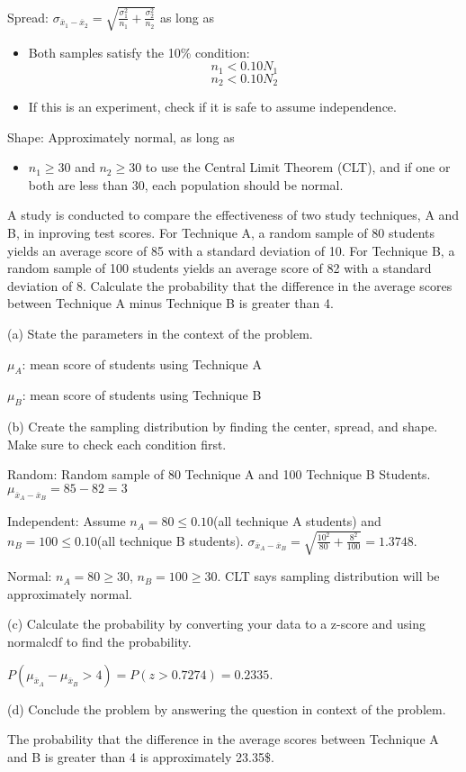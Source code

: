 \documentclass[../stats.tex]{subfiles}
\begin{document}
Spread: $\sigma_{\overline{x}_1-\overline{x}_2}=\sqrt{\frac{\sigma_1^2}{n_1}+\frac{\sigma_2^2}{n_2}}$ as long as 
\begin{itemize}
    \item Both samples satisfy the 10\% condition: 
    \[ n_1<0.10N_1 \] 
    \[ n_2 <0.10 N_2 \]
    \item If this is an experiment, check if it is safe to assume independence.
\end{itemize}

Shape: Approximately normal, as long as 
\begin{itemize}
    \item $n_1\geq 30$ and $n_2\geq 30$ to use the Central Limit Theorem (CLT), and if one or both are less than 30, each population should be normal.
\end{itemize}

\pagebreak
\begin{example}
    A study is conducted to compare the effectiveness of two study techniques, A and B, in inproving test scores. For Technique A, a random sample of 80 students yields an average score of 85 with a standard deviation of 10.
    For Technique B, a random sample of 100 students yields an average score of 82 with a standard deviation of 8. Calculate the probability that the difference in the average scores between Technique A minus Technique B is greater than 4.

    (a) State the parameters in the context of the problem.

    $\mu_A$: mean score of students using Technique A 

    $\mu_B$: mean score of students using Technique B 

    (b) Create the sampling distribution by finding the center, spread, and shape. Make sure to check each condition first.

    Random: Random sample of 80 Technique A and 100 Technique B Students. $\mu_{\overline{x}_A-\overline{x}_B} = 85-82=3$

    Independent: Assume $n_A=80\leq 0.10$(all technique A students) and $n_B=100\leq 0.10$(all technique B students). $\sigma_{\overline{x}_A-\overline{x}_B}=\sqrt{\frac{10^2}{80}+\frac{8^2}{100}}=1.3748$.

    Normal: $n_A=80\geq 30$, $n_B=100\geq 30$. CLT says sampling distribution will be approximately normal.

    (c) Calculate the probability by converting your data to a z-score and using normalcdf to find the probability.

    $P(\mu_{\overline{x}_A}-\mu_{\overline{x}_B} > 4) = P(z>0.7274) = 0.2335$.

    (d) Conclude the problem by answering the question in context of the problem.

    The probability that the difference in the average scores between Technique A and B is greater than 4 is approximately 23.35\$.
\end{example}
\end{document}

